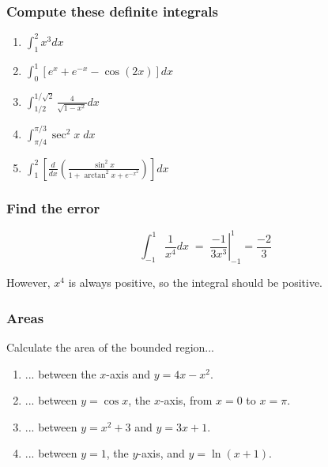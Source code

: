 \documentclass[14pt]{beamer}
\begin{document}
\begin{frame}[t]
	\frametitle{Compute these definite integrals}

	\begin{enumerate}
		\item $\displaystyle \int_{1}^{2}x^{3}dx$
			\vfill

		\item $\displaystyle \int_{0}^{1}\left[ e^{x}+ e^{-x}- \cos (2x) \right] dx$
			\vfill

		\item $\displaystyle \int_{1/2}^{1/\sqrt{2}}\frac{4}{\sqrt{1-x^{2}}}dx$
			\vfill

		\item $\displaystyle \int_{\pi/4}^{\pi/3}\sec^{2}x \; dx$
			\vfill

		\item $\displaystyle \int_{1}^{2}\left[ \frac{d}{dx}\left( \frac{\sin^{2}x }{1
			+ \arctan^{2}x + e^{-x^2}}\right) \right] dx$
			\vfill
	\end{enumerate}
\end{frame}

\begin{frame}[t]
	\frametitle{Find the error}

	\[
		\int_{-1}^{1}\frac{1}{x^{4}}dx \; = \; \left. \frac{-1}{3x^{3}}\right\vert_{-1}
		^{1}= \frac{-2}{3}
	\]

	However, $x^{4}$ is always positive, so the integral should be positive.
\end{frame}

\begin{frame}[t]
	\frametitle{Areas}

	Calculate the area of the bounded region...
	\vspace{.2cm}
	\begin{enumerate}
		\item ... between the $x$-axis and $\displaystyle y=4x-x^{2}$.
			\vspace{.2cm}

		\item ... between $y=\cos x$, the $x$-axis, from $x=0$ to $x=\pi$.
			\vspace{.2cm}

		\item ... between $\displaystyle y=x^{2}+3$ and $\displaystyle y=3x+1$.
			\vspace{.2cm}

		\item ... between $y=1$, the $y$-axis, and $y=\ln(x+1)$.
	\end{enumerate}
\end{frame}
\end{document}

